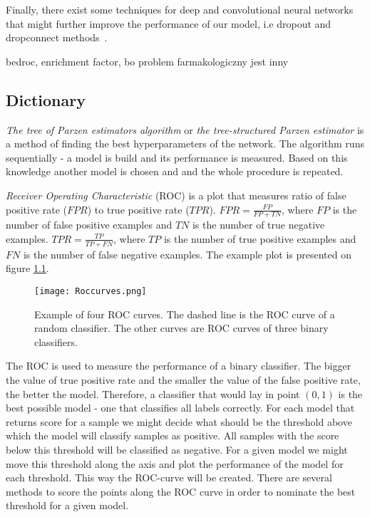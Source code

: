 \documentclass[a4paper,10pt]{report}
\begin{document}
      Finally, there exist some techniques for deep and convolutional neural networks that might further improve the performance of our model, i.e dropout and dropconnect methods~\cite{DUTCH}.
      
      bedroc, enrichment factor, bo problem farmakologiczny jest inny

   \begin{appendices}
    \chapter{Dictionary}\label{appendiks}
      \emph{The tree of Parzen estimators algorithm} or \emph{the tree-structured Parzen estimator} is a method of finding the best hyperparameters of the network. The algorithm runs sequentially - a model is build and its performance is measured. Based on this knowledge another model is chosen and and the whole procedure is repeated.
      
      
      \emph{Receiver Operating Characteristic} (ROC) is a plot that measures ratio of false positive rate ($FPR$) to true positive rate ($TPR$). $FPR = \frac{FP}{FP + TN}$, where $FP$ is the number of false positive examples and $TN$ is the number of true negative examples. $TPR = \frac{TP}{TP + FN}$, where $TP$ is the number of true positive examples and $FN$ is the number of false negative examples. The example plot is presented on figure \ref{fig:ROC}.
      
      \begin{figure}[h!]
	  \centering
	  \texttt{[image: Roccurves.png]}
	  \caption{Example of four ROC curves. The dashed line is the ROC curve of a random classifier. The other curves are ROC curves of three binary classifiers\cite{bibROC}.}
	  \label{fig:ROC}
      \end{figure} 
      
      The ROC is used to measure the performance of a binary classifier. The bigger the value of true positive rate and the smaller the value of the false positive rate, the better the model. Therefore, a classifier that would lay in point ${(0, 1)}$ is the best possible model - one that classifies all labels correctly. For each model that returns score for a sample we might decide  what should be the threshold above which the model will classify samples as positive. All samples with the score below this threshold will be classified as negative. For a given model we might move this threshold along the axis and plot the performance of the model for each threshold. This way the ROC-curve will be created. There are several methods to score the points along the ROC curve in order to nominate the best threshold for a given model.
      

\end{appendices}
\end{document}
